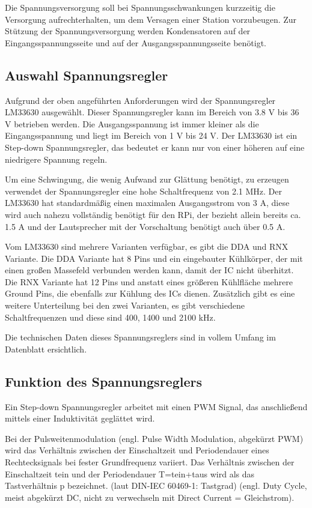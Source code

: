 \documentclass[a4paper, twoside, 12pt, openright]{memoir}
\begin{document}
Die Spannungsversorgung soll bei Spannungsschwankungen kurzzeitig die Versorgung aufrechterhalten, um dem Versagen einer Station vorzubeugen.
Zur Stützung der Spannungsversorgung werden Kondensatoren auf der Eingangsspannungsseite und auf der Ausgangsspannungsseite benötigt.

\subsection{Auswahl Spannungsregler}
Aufgrund der oben angeführten Anforderungen wird der Spannungsregler LM33630 ausgewählt.
Dieser Spannungsregler kann im Bereich von 3.8 V bis 36 V betrieben werden.
Die Ausgangsspannung ist immer kleiner als die Eingangsspannung und liegt im Bereich von 1 V bis 24 V.
Der LM33630 ist ein Step-down Spannungsregler, das bedeutet er kann nur von einer höheren auf eine niedrigere Spannung regeln.\par

Um eine Schwingung, die wenig Aufwand zur Glättung benötigt, zu erzeugen verwendet der Spannungsregler eine hohe Schaltfrequenz von 2.1 MHz.
Der LM33630 hat standardmäßig einen maximalen Ausgangsstrom von 3 A, diese wird auch nahezu vollständig benötigt für den RPi, der bezieht allein bereits ca. 1.5 A und der Lautsprecher mit der Vorschaltung benötigt auch über 0.5 A.\par

Vom LM33630 sind mehrere Varianten verfügbar, es gibt die DDA und RNX Variante.
Die DDA Variante hat 8 Pins und ein eingebauter Kühlkörper, der mit einen großen Massefeld verbunden werden kann, damit der IC nicht überhitzt.
Die RNX Variante hat 12 Pins und anstatt eines größeren Kühlfläche mehrere Ground Pins, die ebenfalls zur Kühlung des ICs dienen.
Zusätzlich gibt es eine weitere Unterteilung bei den zwei Varianten, es gibt verschiedene Schaltfrequenzen und diese sind 400, 1400 und 2100 kHz.\par
Die technischen Daten dieses Spannungsreglers sind in vollem Umfang im Datenblatt ersichtlich. \cite[vgl.][]{lmr33630-datasheet}

\subsection{Funktion des Spannungsreglers}
Ein Step-down Spannungsregler arbeitet mit einen PWM Signal, das anschließend mittels einer Induktivität geglättet wird.\par
Bei der Pulsweitenmodulation (engl. Pulse Width Modulation, abgekürzt PWM) wird das Verhältnis zwischen der Einschaltzeit und Periodendauer eines Rechtecksignals bei fester Grundfrequenz variiert. Das Verhältnis zwischen der Einschaltzeit tein und der Periodendauer T=tein+taus wird als das Tastverhältnis p bezeichnet. (laut DIN-IEC 60469-1: Tastgrad) (engl. Duty Cycle, meist abgekürzt DC, nicht zu verwechseln mit Direct Current = Gleichstrom). \cite[Einleitung]{mikrocontroller-spannungsregler}\par
\end{document}
